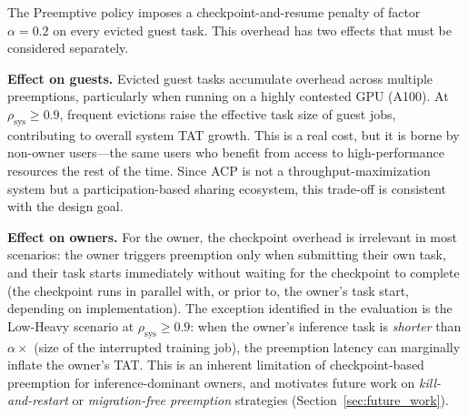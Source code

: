 
The Preemptive policy imposes a checkpoint-and-resume penalty of factor
$\alpha = 0.2$ on every evicted guest task.
This overhead has two effects that must be considered separately.


\textbf{Effect on guests.}
Evicted guest tasks accumulate overhead across multiple preemptions,
particularly when running on a highly contested GPU (A100).
At $\rho_\mathrm{sys} \geq 0.9$, frequent evictions raise the effective
task size of guest jobs, contributing to overall system TAT growth.
This is a real cost, but it is borne by non-owner users---the same users
who benefit from access to high-performance resources the rest of the time.
Since ACP is not a throughput-maximization system but a participation-based
sharing ecosystem, this trade-off is consistent with the design goal.


\textbf{Effect on owners.}
For the owner, the checkpoint overhead is irrelevant in most scenarios:
the owner triggers preemption only when submitting their own task,
and their task starts immediately without waiting for the checkpoint to complete
(the checkpoint runs in parallel with, or prior to, the owner's task start,
depending on implementation).
The exception identified in the evaluation is the Low-Heavy scenario at
$\rho_\mathrm{sys} \geq 0.9$: when the owner's inference task is
\emph{shorter} than $\alpha \times$ (size of the interrupted training job),
the preemption latency can marginally inflate the owner's TAT.
This is an inherent limitation of checkpoint-based preemption for
inference-dominant owners, and motivates future work on
\emph{kill-and-restart} or \emph{migration-free preemption} strategies
(Section~\ref{sec:future_work}).

